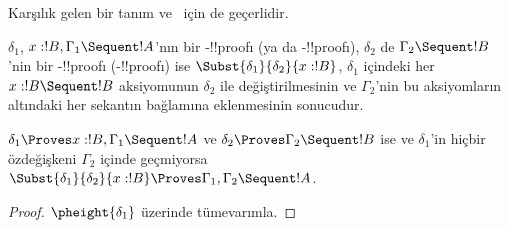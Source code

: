 \documentclass[../../../include/open-logic-section]{subfiles}
\begin{document}
Karşılık gelen bir tanım  ve~ için de geçerlidir.

\begin{defn}
$\delta_1$, $x:!B, \Gamma_1 \Sequent !A$'nın bir -!!{proof}{}ı
(ya da -!!{proof}{}ı), $\delta_2$ de $\Gamma_2 \Sequent !B$'nin bir
-!!{proof}{}ı (-!!{proof}{}ı) ise
$\Subst{\delta_1}{\delta_2}{x:!B}$, $\delta_1$ içindeki her
$x:!B \Sequent !B$ aksiyomunun $\delta_2$ ile değiştirilmesinin ve
$\Gamma_2$'nin bu aksiyomların altındaki her sekantın bağlamına eklenmesinin
sonucudur.
\end{defn}

\begin{prop}
$\delta_1 \Proves x:!B, \Gamma_1 \Sequent !A$ ve
$\delta_2 \Proves \Gamma_2 \Sequent !B$ ise ve $\delta_1$'in hiçbir
özdeğişkeni $\Gamma_2$ içinde geçmiyorsa
$\Subst{\delta_1}{\delta_2}{x:!B} \Proves \Gamma_1, \Gamma_2 \Sequent !A$.
\end{prop}


\begin{proof}
  $\pheight{\delta_1}$ üzerinde tümevarımla.
\end{proof}
\end{document}
